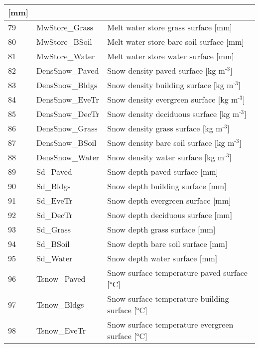 \documentclass[letterpaper,10pt,english]{sphinxmanual}
\begin{document}
\begin{savenotes}
\begin{longtable}{|l|l|l|}
{[}mm{]}
\\
\hline
79
&
MwStore\_Grass
&
Melt water store \textendash{}
grass surface {[}mm{]}
\\
\hline
80
&
MwStore\_BSoil
&
Melt water store \textendash{}
bare soil surface
{[}mm{]}
\\
\hline
81
&
MwStore\_Water
&
Melt water store \textendash{}
water surface {[}mm{]}
\\
\hline
82
&
DensSnow\_Paved
&
Snow density \textendash{} paved
surface {[}kg
m$^{\text{-3}}${]}
\\
\hline
83
&
DensSnow\_Bldgs
&
Snow density \textendash{}
building surface {[}kg
m$^{\text{-3}}${]}
\\
\hline
84
&
DensSnow\_EveTr
&
Snow density \textendash{}
evergreen surface {[}kg
m$^{\text{-3}}${]}
\\
\hline
85
&
DensSnow\_DecTr
&
Snow density \textendash{}
deciduous surface {[}kg
m$^{\text{-3}}${]}
\\
\hline
86
&
DensSnow\_Grass
&
Snow density \textendash{} grass
surface {[}kg
m$^{\text{-3}}${]}
\\
\hline
87
&
DensSnow\_BSoil
&
Snow density \textendash{} bare
soil surface {[}kg
m$^{\text{-3}}${]}
\\
\hline
88
&
DensSnow\_Water
&
Snow density \textendash{} water
surface {[}kg
m$^{\text{-3}}${]}
\\
\hline
89
&
Sd\_Paved
&
Snow depth \textendash{} paved
surface {[}mm{]}
\\
\hline
90
&
Sd\_Bldgs
&
Snow depth \textendash{} building
surface {[}mm{]}
\\
\hline
91
&
Sd\_EveTr
&
Snow depth \textendash{}
evergreen surface
{[}mm{]}
\\
\hline
92
&
Sd\_DecTr
&
Snow depth \textendash{}
deciduous surface
{[}mm{]}
\\
\hline
93
&
Sd\_Grass
&
Snow depth \textendash{} grass
surface {[}mm{]}
\\
\hline
94
&
Sd\_BSoil
&
Snow depth \textendash{} bare
soil surface {[}mm{]}
\\
\hline
95
&
Sd\_Water
&
Snow depth \textendash{} water
surface {[}mm{]}
\\
\hline
96
&
Tsnow\_Paved
&
Snow surface
temperature \textendash{} paved
surface {[}°C{]}
\\
\hline
97
&
Tsnow\_Bldgs
&
Snow surface
temperature \textendash{}
building surface {[}°C{]}
\\
\hline
98
&
Tsnow\_EveTr
&
Snow surface
temperature \textendash{}
evergreen surface
{[}°C{]}

\end{longtable}
\end{savenotes}
\end{document}
